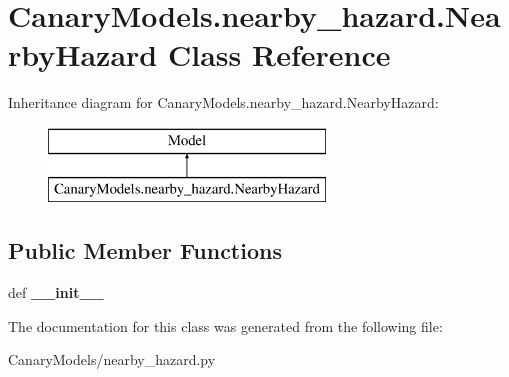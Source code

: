 \hypertarget{class_canary_models_1_1nearby__hazard_1_1_nearby_hazard}{\section{Canary\-Models.\-nearby\-\_\-hazard.\-Nearby\-Hazard Class Reference}
\label{class_canary_models_1_1nearby__hazard_1_1_nearby_hazard}
}
Inheritance diagram for Canary\-Models.\-nearby\-\_\-hazard.\-Nearby\-Hazard\-:\begin{figure}[H]
\begin{center}
\leavevmode
\includegraphics[height=2.000000cm]{class_canary_models_1_1nearby__hazard_1_1_nearby_hazard}
\end{center}
\end{figure}
\subsection*{Public Member Functions}
\begin{DoxyCompactItemize}
\item 
\hypertarget{class_canary_models_1_1nearby__hazard_1_1_nearby_hazard_abeea698a4daed5a414e28b188ca89c52}{def {\bfseries \-\_\-\-\_\-init\-\_\-\-\_\-}}\label{class_canary_models_1_1nearby__hazard_1_1_nearby_hazard_abeea698a4daed5a414e28b188ca89c52}

\end{DoxyCompactItemize}


The documentation for this class was generated from the following file\-:\begin{DoxyCompactItemize}
\item 
Canary\-Models/nearby\-\_\-hazard.\-py\end{DoxyCompactItemize}
